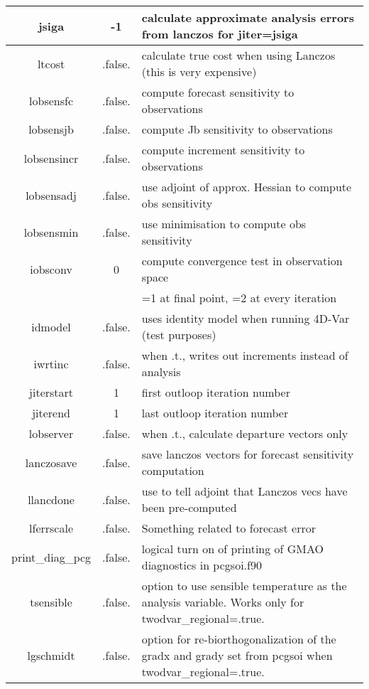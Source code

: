 \begin{table}[h]
\begin{tabular}{| c | c | p{9cm} |}
  \hline
  jsiga	& -1 & calculate approximate analysis errors from lanczos for jiter=jsiga \\
  \hline
  ltcost & .false. & calculate true cost when using Lanczos (this is very expensive) \\
  \hline
  lobsensfc	& .false. & compute forecast sensitivity to observations \\
  \hline
  lobsensjb & .false. & compute Jb sensitivity to observations \\
  \hline
  lobsensincr & .false. & compute increment sensitivity to observations \\
  \hline
  lobsensadj & .false. & use adjoint of approx. Hessian to compute obs sensitivity \\
  \hline
  lobsensmin & .false. & use minimisation to compute obs sensitivity \\
  \hline
  iobsconv & 0 & compute convergence test in observation space \\
        & & =1 at final point, =2 at every iteration \\
  \hline
  idmodel & .false. & uses identity model when running 4D-Var (test purposes) \\
  \hline
  iwrtinc & .false.	& when .t., writes out increments instead of analysis \\
  \hline
  jiterstart & 1 & first outloop iteration number \\
  \hline
  jiterend & 1 & last outloop iteration number \\
  \hline
  lobserver & .false. & when .t., calculate departure vectors only \\
  \hline
  lanczosave & .false. & save lanczos vectors for forecast sensitivity computation \\
  \hline
  llancdone & .false. & use to tell adjoint that Lanczos vecs have been pre-computed \\
  \hline
  lferrscale & .false. & Something related to forecast error \\
  \hline
  print\_diag\_pcg & .false. & logical turn on of printing of GMAO diagnostics in pcgsoi.f90 \\
  \hline
  tsensible & .false. & option to use sensible temperature as the analysis variable. Works only for twodvar\_regional=.true. \\
  \hline
  lgschmidt & .false. & option for re-biorthogonalization of the {gradx} and {grady} set from pcgsoi when twodvar\_regional=.true. \\
  \hline
  \end{tabular}
\end{table}

